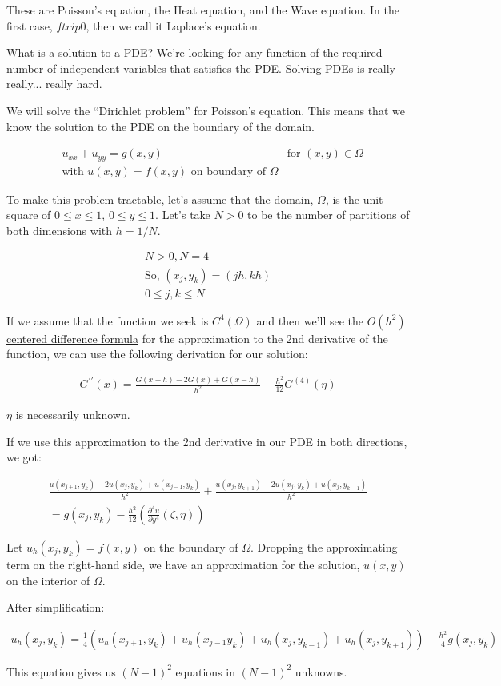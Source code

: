 These are Poisson's equation, the Heat equation, and the Wave equation. In the first case, $f trip 0$, then we call it Laplace's equation. 

What is a solution to a PDE? We're looking for  any function of the required number of independent variables that satisfies the PDE. Solving PDEs is really really... really hard.

We will solve the ``Dirichlet problem'' for Poisson's equation. This means that we know the solution to the PDE on the boundary of the domain.

\begin{align*}
  &u_{xx} + u_{yy} = g(x, y) &\text{for }(x, y) \in \Omega \\
  &\text{with } u(x, y) = f(x, y) \text{ on boundary of } \Omega 
\end{align*}

To make this problem tractable, let's assume that the domain, $\Omega$, is the unit square of $0 \leq x \leq 1$, $0 \leq y \leq 1$. Let's take $N > 0$ to be the number of partitions of both dimensions with $h = 1/N$.

\begin{align*}
  N > 0, N = 4 \\
  \text{So, } (x_j, y_k) = (jh, kh) \\
  0 \leq j, k \leq N
\end{align*}

If we assume that the function we seek is $C^4(\Omega)$ and then we'll see the \underline{$O(h^2)$ centered difference formula} for the approximation to the 2nd derivative of the function, we can use the following derivation for our solution:

\begin{align*}
  G^{\prime\prime}(x) = \frac{G(x+h) - 2 G(x) + G(x-h)}{h^2} - \frac{h^2}{12} G^{(4)}(\eta)
\end{align*}

$\eta$ is necessarily unknown.

If we use this approximation to the 2nd derivative in our PDE in both directions, we got:

\begin{align*}
  \frac{u(x_{j+1}, y_k) - 2 u(x_j, y_k) + u(x_{j-1}, y_k)}{h^2} + \frac{u(x_j, y_{k+1}) - 2 u(x_j, y_k) + u(x_j, y_{k-1})}{h^2} \\
  = g(x_j, y_k) - \frac{h^2}{12} (\frac{\partial^4 u}{\partial y^4}(\zeta, \eta))
\end{align*}

Let $u_h(x_j, y_k) = f(x, y)$ on the boundary of $\Omega$. Dropping the approximating term on the right-hand side, we have an approximation for the solution, $u(x, y)$ on the interior of $\Omega$.

After simplification:

\begin{align*}
  u_h(x_j, y_k) = \frac{1}{4} ( u_h(x_{j+1}, y_k) + u_h(x_{j-1}{y_k}) + u_h(x_j, y_{k-1}) + u_h(x_j, y_{k+1}) ) - \frac{h^2}{4} g(x_j, y_k)
\end{align*}

This equation gives us $(N-1)^2$ equations in $(N-1)^2$ unknowns.